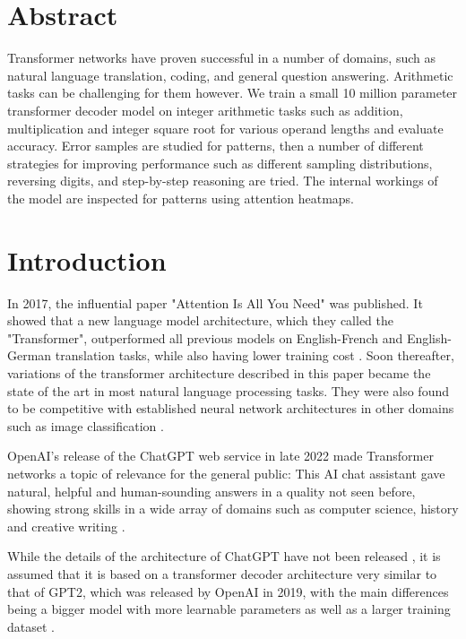 \thispagestyle{empty}
\section*{Abstract}

Transformer networks have proven successful in a number of domains, such as natural language translation, coding, and general question answering. Arithmetic tasks can be challenging for them however.
We train a small 10 million parameter transformer decoder model on integer arithmetic tasks such as addition, multiplication and integer square root for various operand lengths and evaluate accuracy.
Error samples are studied for patterns, then a number of different strategies for improving performance such as different sampling distributions, reversing digits, and step-by-step reasoning are tried. The internal workings of the model are inspected for patterns using attention heatmaps.

\clearpage

\tableofcontents
\clearpage

\section{Introduction}

In 2017, the influential paper "Attention Is All You Need" \cite{allyouneed} was published. It showed that a new language model architecture, which they called the "Transformer", outperformed all previous models on English-French and English-German translation tasks, while also having lower training cost . Soon thereafter, variations of the transformer architecture described in this paper became the state of the art in most natural language processing tasks. They were also found to be competitive with established neural network architectures in other domains such as image classification .

OpenAI's release of the ChatGPT web service in late 2022 \cite{openai_chatgpt_2022} made Transformer networks a topic of relevance for the general public: This AI chat assistant gave natural, helpful and human-sounding answers in a quality not seen before, showing strong skills in a wide array of domains such as computer science, history and creative writing \cite{Savelka_2023} .

While the details of the architecture of ChatGPT have not been released \cite{openai_chatgpt_2022} \cite{openai2023gpt4}, it is assumed that it is based on a transformer decoder architecture very similar to that of GPT2, which was released by OpenAI in 2019, with the main differences being a bigger model with more learnable parameters as well as a larger training dataset \cite{OpenGenus2023GPTComparison}.

